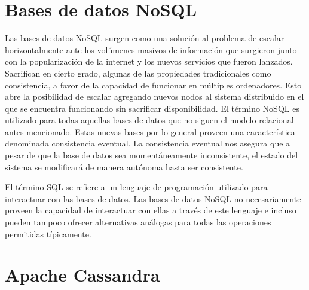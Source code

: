 \documentclass[11pt,a4paper]{article}
\begin{document}
\section{Bases de datos NoSQL}
Las bases de datos NoSQL surgen como una solución al problema de escalar horizontalmente ante los volúmenes masivos de información que surgieron junto con la popularización de la internet y los nuevos servicios que fueron lanzados. Sacrifican en cierto grado, algunas de las propiedades tradicionales como consistencia, a favor de la capacidad de funcionar en múltiples ordenadores. Esto abre la posibilidad de escalar agregando nuevos nodos al sistema distribuido en el que se encuentra funcionando sin sacrificar disponibilidad. El término NoSQL es utilizado para todas aquellas bases de datos que no siguen el modelo relacional antes mencionado. Estas nuevas bases por lo general proveen una característica denominada consistencia eventual. La consistencia eventual nos asegura que a pesar de que la base de datos sea momentáneamente inconsistente, el estado del sistema se modificará de manera autónoma hasta ser consistente.

El término SQL se refiere a un lenguaje de programación utilizado para interactuar con las bases de datos. Las bases de datos NoSQL no necesariamente proveen la capacidad de interactuar con ellas a través de este lenguaje e incluso pueden tampoco ofrecer alternativas análogas para todas las operaciones permitidas típicamente.

\section{Apache Cassandra}
\end{document}
